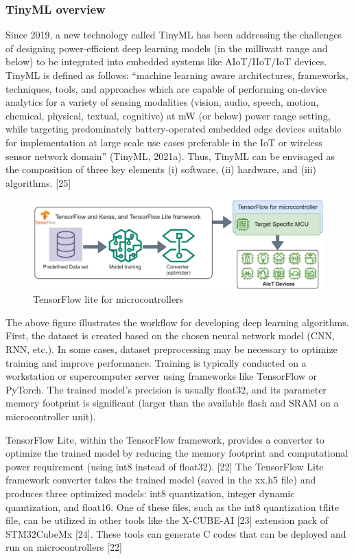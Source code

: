 \subsubsection{TinyML overview}
\indent  Since 2019, a new technology called TinyML has been addressing the challenges of designing power-efficient deep learning models (in the milliwatt range and below) to be integrated into embedded systems like AIoT/IIoT/IoT devices.
TinyML is defined as follows: “machine learning aware architectures, frameworks, techniques, tools, and approaches which are capable of performing on-device analytics for a variety of sensing modalities (vision, audio, speech, motion, chemical, physical, textual, cognitive) at mW (or below) power range setting, while targeting predominately battery-operated embedded edge devices suitable for implementation at large scale use cases preferable in the IoT or wireless sensor network domain” (TinyML, 2021a). Thus, TinyML can be envisaged as the composition of three key elements (i) software, (ii) hardware, and (iii) algorithms. [25]
\begin{center}
    \begin{figure}[!htp]
        \centering
        \includegraphics[width=0.8 \textwidth]{image/tf_lite.webp}
        \caption{TensorFlow lite for microcontrollers}
        \label{subsection}
    \end{figure}
    \end{center}

The above figure illustrates the workflow for developing deep learning algorithms. First, the dataset is created based on the chosen neural network model (CNN, RNN, etc.). 
In some cases, dataset preprocessing may be necessary to optimize training and improve performance. Training is typically conducted on a workstation or supercomputer server using frameworks like TensorFlow or PyTorch. 
The trained model's precision is usually float32, and its parameter memory footprint is significant (larger than the available flash and SRAM on a microcontroller unit).

TensorFlow Lite, within the TensorFlow framework, provides a converter to optimize the trained model by reducing the memory footprint and computational power requirement (using int8 instead of float32). [22]
The TensorFlow Lite framework converter takes the trained model (saved in the xx.h5 file) and produces three optimized models: int8 quantization, integer dynamic quantization, and float16. One of these files, such as the int8 quantization tflite file, 
can be utilized in other tools like the X-CUBE-AI [23] extension pack of STM32CubeMx [24]. These tools can generate C codes that can be deployed and run on microcontrollers [22]
